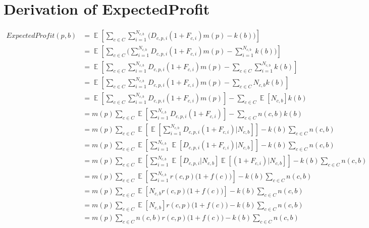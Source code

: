 \documentclass[11pt]{article} %
\DeclareMathOperator{\EX}{\mathbb{E}}
\begin{document}
\section{Derivation of ExpectedProfit}\label{sec.DerExpProf}
\begin{align*}
ExpectedProfit(p,b) 
&= \EX\left[\sum_{c \in C}{\sum_{i =1}^{N_{c,b}}{\bigg( D_{c,p,i}(1+F_{c,i})m(p)-k(b)\bigg)}}\right]\\
&= \EX\left[\sum_{c \in C}{\bigg(\sum_{i =1}^{N_{c,b}}{ D_{c,p,i}(1+F_{c,i})m(p)}-\sum_{i =1}^{N_{c,b}}k(b)\bigg)}\right]\\
&= \EX\left[\sum_{c \in C}{\sum_{i =1}^{N_{c,b}}{ D_{c,p,i}(1+F_{c,i})m(p)}}-\sum_{c \in C}{\sum_{i =1}^{N_{c,b}}k(b)}\right]\\
&= \EX\left[\sum_{c \in C}{\sum_{i =1}^{N_{c,b}}{ D_{c,p,i}(1+F_{c,i})m(p)}}-\sum_{c \in C}{N_{c,b}k(b)}\right]\\
&= \EX\left[\sum_{c \in C}{\sum_{i =1}^{N_{c,b}}{ D_{c,p,i}(1+F_{c,i})m(p)}}\right]-\sum_{c \in C}{\EX[N_{c,b}]k(b)}\\
&= m(p)\sum_{c \in C}{\EX\left[\sum_{i =1}^{N_{c,b}}{ D_{c,p,i}(1+F_{c,i})}\right]}-\sum_{c \in C}{n(c,b)k(b)}\\
&= m(p)\sum_{c \in C}{\EX\left[\EX\left[\sum_{i =1}^{N_{c,b}}{ D_{c,p,i}(1+F_{c,i})}\Bigg|N_{c,b}\right]\right]}-k(b)\sum_{c \in C}{n(c,b)}\\
&= m(p)\sum_{c \in C}{\EX\left[\sum_{i =1}^{N_{c,b}}{\EX\left[D_{c,p,i}(1+F_{c,i})\bigg|N_{c,b}\right]}\right]}-k(b)\sum_{c \in C}{n(c,b)}\\
&= m(p)\sum_{c \in C}{\EX\left[\sum_{i =1}^{N_{c,b}}{\EX\left[D_{c,p,i}\bigg|N_{c,b}\right]\EX\left[(1+F_{c,i})\bigg|N_{c,b}\right]}\right]}-k(b)\sum_{c \in C}{n(c,b)}\\
&= m(p)\sum_{c \in C}{\EX\left[\sum_{i =1}^{N_{c,b}}{r(c,p)\Big(1+f(c)\Big)}\right]}-k(b)\sum_{c \in C}{n(c,b)}\\
&= m(p)\sum_{c \in C}{\EX\left[N_{c,b}r(c,p)\Big(1+f(c)\Big)\right]}-k(b)\sum_{c \in C}{n(c,b)}\\
&= m(p)\sum_{c \in C}{\EX\left[N_{c,b}\right]r(c,p)\Big(1+f(c)\Big)}-k(b)\sum_{c \in C}{n(c,b)}\\
&= m(p)\sum_{c \in C}{n(c,b)r(c,p)\Big(1+f(c)\Big)}-k(b)\sum_{c \in C}{n(c,b)}
\end{align*}
\end{document}

